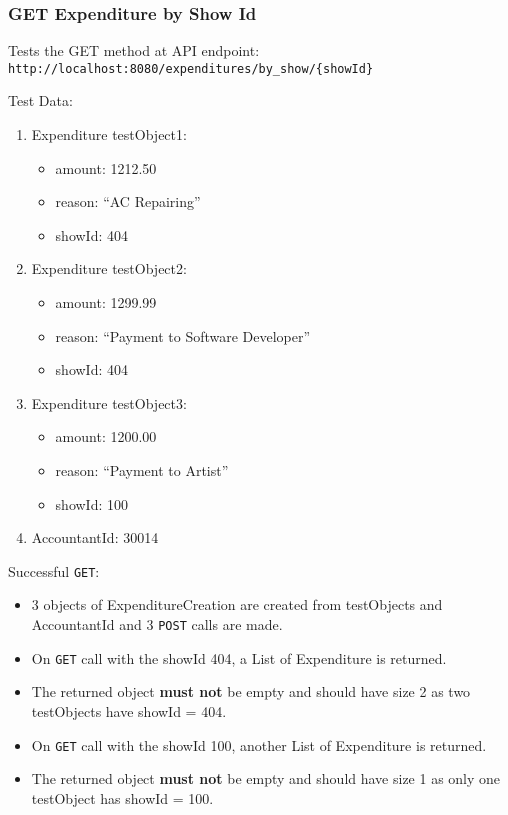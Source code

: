 \documentclass[]{article}
\providecommand{\tightlist}{%
  \setlength{\itemsep}{0pt}\setlength{\parskip}{0pt}}
\begin{document}
\hypertarget{get-expenditure-by-show-id}{%
\subsubsection{GET Expenditure by Show
Id}\label{get-expenditure-by-show-id}}

Tests the GET method at API endpoint:
\texttt{http://localhost:8080/expenditures/by\_show/\{showId\}}

Test Data:

\begin{enumerate}
\def\labelenumi{\arabic{enumi}.}
\tightlist
\item
  Expenditure testObject1:

  \begin{itemize}
  \tightlist
  \item
    amount: 1212.50
  \item
    reason: ``AC Repairing''
  \item
    showId: 404
  \end{itemize}
\item
  Expenditure testObject2:

  \begin{itemize}
  \tightlist
  \item
    amount: 1299.99
  \item
    reason: ``Payment to Software Developer''
  \item
    showId: 404
  \end{itemize}
\item
  Expenditure testObject3:

  \begin{itemize}
  \tightlist
  \item
    amount: 1200.00
  \item
    reason: ``Payment to Artist''
  \item
    showId: 100
  \end{itemize}
\item
  AccountantId: 30014
\end{enumerate}

Successful \texttt{GET}:

\begin{itemize}
\tightlist
\item
  3 objects of ExpenditureCreation are created from testObjects and
  AccountantId and 3 \texttt{POST} calls are made.
\item
  On \texttt{GET} call with the showId 404, a List of Expenditure is
  returned.
\item
  The returned object \textbf{must not} be empty and should have size 2
  as two testObjects have showId = 404.
\item
  On \texttt{GET} call with the showId 100, another List of Expenditure
  is returned.
\item
  The returned object \textbf{must not} be empty and should have size 1
  as only one testObject has showId = 100.
\end{itemize}
\end{document}
